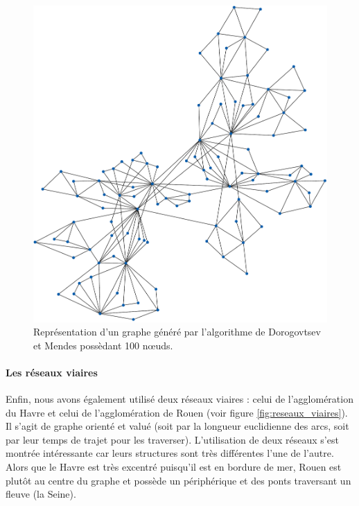 \documentclass[a4paper, 10pt]{report}
\begin{document}
\begin{figure}[h!]
	\centering
	\includegraphics[width=.75\textwidth]{./img/screenshot_Dorogovtsev_Mendes.pdf}
	\caption{Représentation d'un graphe généré par l'algorithme de Dorogovtsev et Mendes possèdant 100 n\oe uds.}
	\label{fig:screenshot_Dorogovtsev_Mendes}
\end{figure}

\newpage

\paragraph{Les réseaux viaires}Enfin, nous avons également utilisé deux réseaux viaires : celui de l'agglomération du Havre et celui de l'agglomération de Rouen (voir figure \ref{fig:reseaux_viaires}). Il s'agit de graphe orienté et valué (soit par la longueur euclidienne des arcs, soit par leur temps de trajet pour les traverser). L'utilisation de deux réseaux s'est montrée intéressante car leurs structures sont très différentes l'une de l'autre. Alors que le Havre est très excentré puisqu'il est en bordure de mer, Rouen est plutôt au centre du graphe et possède un périphérique et des ponts traversant un fleuve (la Seine).
\end{document}
